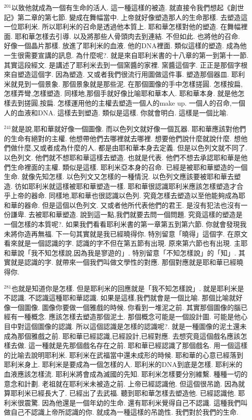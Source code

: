 \documentclass{book}
\begin{document}
$^{201}$以致他就成為一個有生命的活人.
這一種這樣的被造.
就直接令我們想起《創世記》第二章的第七節.
變成在舞幅當中.
上帝就好像塑造那人的生命那樣.
去塑造這一位耶利米.
所以耶利米的召命是透過他本質上.
耶和華怎樣對他的塑造.
在舞幅裡面.
耶和華怎樣去引導.
以及將那些人骨頭肉去到連結.
不但如此.
也將他的召命.
好像一個晶片那樣.
放進了耶利米的血液.
他的DNA裡面.
類似這樣的塑造.
成為他一生很需要宣講的訊息.
為什麼呢?.
就是來自耶利米書的十八章的第一到第十一節.
其實這段經文.
是講述了耶利米去到一個窯醬的家裡.
窯醬這個字.
正正是那個字根來自塑造這個字.
因為塑造.
又或者我們很流行用圖做這件事.
塑造那個器皿.
耶利米就見到一個景象.
那個景象就是那些泥.
在那個圖像的手中怎樣搓圓.
怎樣按扁,怎樣弄彎,怎樣塑造.
同樣地,那個手就好像比喻耶和華本人.
耶和華本身.
就是他怎樣去到搓圓,按扁.
怎樣運用他的主權去塑造一個人的make up.
一個人的召命,一個人的血液和DNA.
這樣去到塑造.
類似是這樣.
你就會明白.
這樣是一個比喻.

$^{241}$就是說,耶和華就好像一個圖像.
而以色列文就好像一個瓦器.
耶和華應該對他們的生命有絕對的主權.
他想帶他們去哪裡就去哪裡.
想要他們說什麼就說什麼.
想他們做什麼,又或者成為什麼的人.
都是由耶和華本身去定義.
但是以色列文就不同了.
以色列文.
他們就不想耶和華這樣去塑造.
也就是代表.
他們不想去承認耶和華是他們生命裡面的主權.
類似是這樣.
耶利米亞本身的召命.
已經是被耶和華塑造的一個生命.
就像先知怎樣.
以色列文又怎樣的一種情況.
以色列文應該要被耶和華去塑造.
彷如耶利米就這樣被耶和華塑造一樣.
耶和華很認識耶利米應該怎樣塑造才合乎上帝的器命.
同樣地,耶和華也很認識以色列.
究竟怎樣去塑造以至他能夠成為耶和華的器命.
但是這個以色列文.
又或者他所代表他們的君王.
是沒有犯法也沒有一份謙卑.
去被耶和華塑造.
說到這一點,我們就要去問一個問題.
究竟這樣的塑造是一個怎樣的本質呢?.
如果我們看看耶利米書的第一章第五到第六節.
你就會發現我未將你造再無福.
下一句其實就是我已經曉得你.
特別留意「曉得」這個字.
在原文看來就是一個認識的字.
認識的字不但在第五節有出現.
原來第六節也有出現.
主耶和華說「我不知怎樣說,因為我是寥遊的」.
特別留意「不知怎樣說」的「知」.
其實就是認識的字.
就帶來一個我們叫做文學性的對應.
那個對應就是耶和華已經曉得你.

$^{281}$也就是知道你是怎樣.
但是耶利米的回應就是「我不知怎樣說」.
就是耶利米是不認識.
不認識這種耶和華認識.
如果是這樣,我們就會是一個比喻.
那個比喻就好像一個圖像.
圖像你要做一個雅戲的時候.
你看到一堆泥之前.
其實那個圖像的腦已經有一種概念.
應該怎樣去塑造那個泥土.
那個概念可能是一個設計圖.
可能是他心目中對這個圖像的認識.
所以這個認識是怎樣的認識呢?.
就是一種圖像的泥土還未成為那個雅戲之前.
耶和華已經認識,已經設計,已經對應.
去想究竟這個戲名應該怎樣去做.
這一種就是先那個戲名存在之前.
耶和華已經認識了那個戲名.
用一個這樣的比喻去說明耶利米.
耶利米在武福當中還未成形的時候.
耶和華的心意已經落到耶利米身上.
耶利米是要成為一個怎樣的人.
耶利米的DNA到底是怎樣.
耶利米的血液應該怎樣流.
耶利米將會成為滅國的先知.
耶利米怎樣要分別維繫.
種種一切的意念和計劃.
老祖就在耶利米未被造之前.
上帝已經認識他.
但這個很吊詭.
因為就算耶利米已經長大了.
已經出了去武福.
聽到耶和華怎樣去塑造他.
已經認識他.
耶利米很震驚.
因為他還是一個年幼的生命.
還有耶利米覺得自己不認識.
這種我們叫做自己不認識上帝所認識的你.
就成為一種這樣的吊詭性.
我們對於我們的生命.
\end{document}
